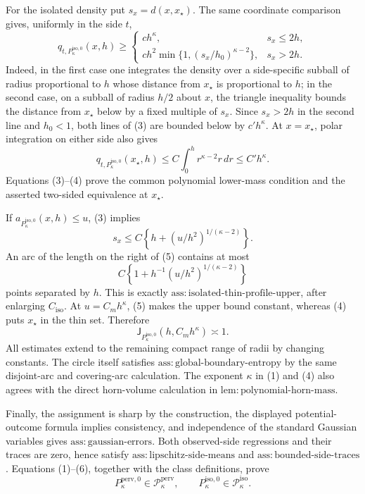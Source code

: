 For the isolated density put \(s_x=d(x,x_{\star})\).  The same coordinate comparison gives, uniformly in the side \(t\),
\[
 q_{t,P_{\kappa}^{\mathrm{iso},0}}(x,h)\ge
 \begin{cases}
 c h^{\kappa},&s_x\le2h,\\
 c h^2\min\{1,(s_x/h_0)^{\kappa-2}\},&s_x>2h.
 \end{cases} \tag{3}
\]
Indeed, in the first case one integrates the density over a side-specific subball of radius proportional to \(h\) whose distance from \(x_{\star}\) is proportional to \(h\); in the second case, on a subball of radius \(h/2\) about \(x\), the triangle inequality bounds the distance from \(x_{\star}\) below by a fixed multiple of \(s_x\).  Since \(s_x>2h\) in the second line and \(h_0<1\), both lines of (3) are bounded below by \(c'h^{\kappa}\).  At \(x=x_{\star}\), polar integration on either side also gives
\[
 q_{t,P_{\kappa}^{\mathrm{iso},0}}(x_{\star},h)
 \le C\int_0^h r^{\kappa-2}r\,dr
 \le C'h^{\kappa}. \tag{4}
\]
Equations (3)--(4) prove the common polynomial lower-mass condition and the asserted two-sided equivalence at \(x_{\star}\).

If \(a_{P_{\kappa}^{\mathrm{iso},0}}(x,h)\le u\), (3) implies
\[
 s_x\le C\left\{h+(u/h^2)^{1/(\kappa-2)}\right\}. \tag{5}
\]
An arc of the length on the right of (5) contains at most
\[
 C\left\{1+h^{-1}(u/h^2)^{1/(\kappa-2)}\right\}
\]
points separated by \(h\).  This is exactly \(\mathrm{ass:isolated\text{-}thin\text{-}profile\text{-}upper}\), after enlarging \(C_{\mathrm{iso}}\).  At \(u=C_mh^{\kappa}\), (5) makes the upper bound constant, whereas (4) puts \(x_{\star}\) in the thin set.  Therefore
\[
 \mathsf J_{P_{\kappa}^{\mathrm{iso},0}}(h,C_mh^{\kappa})\asymp1. \tag{6}
\]
All estimates extend to the remaining compact range of radii by changing constants.  The circle itself satisfies \(\mathrm{ass:global\text{-}boundary\text{-}entropy}\) by the same disjoint-arc and covering-arc calculation.  The exponent \(\kappa\) in (1) and (4) also agrees with the direct horn-volume calculation in \(\mathrm{lem:polynomial\text{-}horn\text{-}mass}\).

Finally, the assignment is sharp by the construction, the displayed potential-outcome formula implies consistency, and independence of the standard Gaussian variables gives \(\mathrm{ass:gaussian\text{-}errors}\).  Both observed-side regressions and their traces are zero, hence satisfy \(\mathrm{ass:lipschitz\text{-}side\text{-}means}\) and \(\mathrm{ass:bounded\text{-}side\text{-}traces}\).  Equations (1)--(6), together with the class definitions, prove
\[
 P_{\kappa}^{\mathrm{perv},0}\in\mathcal P_{\kappa}^{\mathrm{perv}},
 \qquad
 P_{\kappa}^{\mathrm{iso},0}\in\mathcal P_{\kappa}^{\mathrm{iso}}.
\]